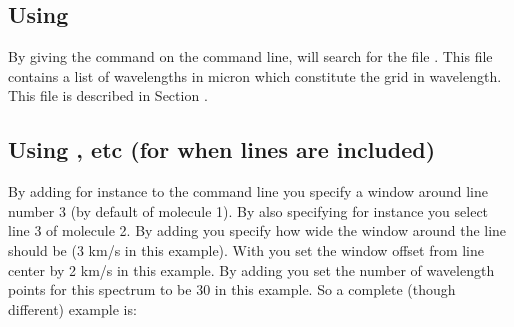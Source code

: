 \documentclass[letterpaper,10pt,english]{sphinxmanual}
\begin{document}
\subsection{Using }
\label{\detokenize{imagesspectra:using-loadlambda}}
By giving the command  on the command line,  will
search for the file . This file contains a list
of wavelengths in micron which constitute the grid in wavelength. This file is
described in Section {\hyperref[\detokenize{inputoutputfiles:sec-camera-wavelengths}]{}}.


\subsection{Using ,  etc (for when lines are included)}
\label{\detokenize{imagesspectra:using-iline-imolspec-etc-for-when-lines-are-included}}
By adding for instance  to the command line you specify a window
around line number 3 (by default of molecule 1). By also specifying for instance
 you select line 3 of molecule 2. By adding  you
specify how wide the window around the line should be (3 km/s in this
example). With  you set the window offset from line center by 2 km/s
in this example. By adding  you set the number of wavelength
points for this spectrum to be 30 in this example. So a complete (though
different) example is:

\begin{sphinxVerbatim}[commandchars=\\\{\}]
               
\end{sphinxVerbatim}
\end{document}
